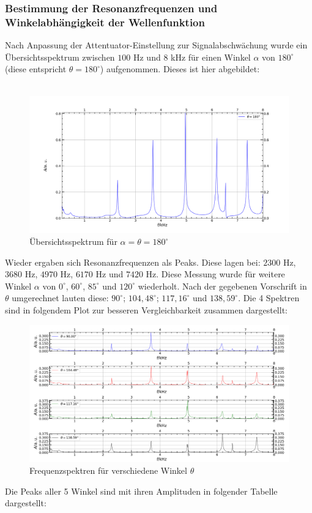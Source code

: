 \documentclass[german,  %
parskip=full,  %
]{scrartcl}
\begin{document}
\subsubsection{Bestimmung der Resonanzfrequenzen und Winkelabhängigkeit der Wellenfunktion}
Nach Anpassung der Attentuator-Einstellung zur Signalabschwächung wurde ein Übersichtsspektrum zwischen $100$ Hz und $8$ kHz für einen Winkel $\alpha$ von $180^{\circ}$ (diese entspricht $\theta = 180^{\circ}$) aufgenommen. Dieses ist hier abgebildet: \\\\
\begin{figure}[h!]
\centering
\includegraphics[width=\textwidth]{4311}
\caption{Übersichtsspektrum für $\alpha = \theta = 180^{\circ}$}
\end{figure}
Wieder ergaben sich Resonanzfrequenzen als Peaks. Diese lagen bei: $2300$ Hz, $3680$ Hz, $4970$ Hz, $6170$ Hz und $7420$ Hz.
Diese Messung wurde für weitere Winkel $\alpha$ von  $0^{\circ}$, $60^{\circ}$, $85^{\circ}$ und $120^{\circ}$ wiederholt. Nach der gegebenen Vorschrift in $\theta$ umgerechnet lauten diese: $90^{\circ}$; $104,48^{\circ}$; $117,16^{\circ}$ und $138,59^{\circ}$. Die 4 Spektren sind in folgendem Plot zur besseren Vergleichbarkeit zusammen dargestellt:
\begin{figure}[h]
\centering
\includegraphics[width=\textwidth]{4312.png}
\caption{Frequenzspektren für verschiedene Winkel $\theta$}
\end{figure}
Die Peaks aller 5 Winkel sind mit ihren Amplituden in folgender Tabelle dargestellt:
\end{document}
